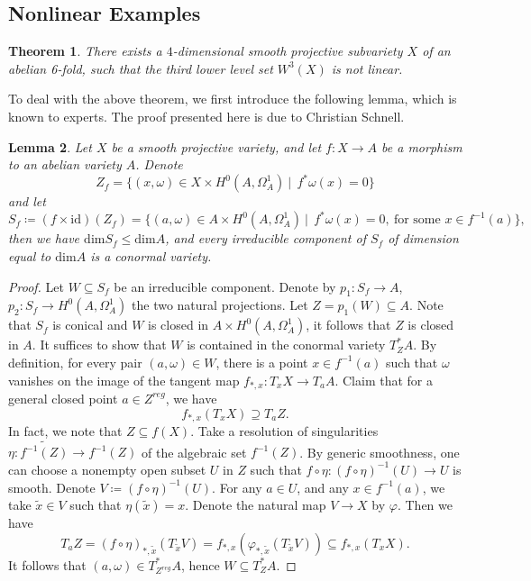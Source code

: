 \documentclass[a4paper,12pt,reqno]{amsart}
\newtheorem{theorem}{Theorem}[section]
\newtheorem{lemma}[theorem]{Lemma}
\theoremstyle{question}
\theoremstyle{definition}
\theoremstyle{remark}
\theoremstyle{cited}
\theoremstyle{citeddef}
\let\tilde\widetilde
\begin{document}
\subsection{Nonlinear Examples}


\begin{theorem}\label{thm:non-linear example}
There exists a $4$-dimensional smooth projective subvariety $X$ of an abelian 6-fold, such that the third lower level set $W^3(X)$ is not linear.
\end{theorem}
 
To deal with the above theorem, we first introduce the following lemma, which is known to experts. The proof presented here is due to Christian Schnell.

\begin{lemma}\label{lem:conormalspace-nonlinear}
  Let $X$ be a smooth projective variety, and let $f\colon X\to A$ be a morphism to an abelian variety $A$. Denote $$Z_{f}=\{(x,\omega)\in X\times H^{0}(A,\Omega^{1}_{A}) ~|~~ f^{*}\omega(x)=0 \}$$ and let $$S_{f}\coloneqq(f\times \mathrm{id})(Z_{f})=\{(a,\omega)\in A\times H^{0}(A,\Omega^{1}_{A}) ~|~~  f^{*}\omega(x)=0,\ \text{for some }x\in f^{-1}(a) \},$$ then we have 
$\mathrm{dim} S_{f}\leq\mathrm{dim} A$, and every irreducible component of $S_{f}$ of dimension equal to $\mathrm{dim}A$ is a conormal variety.   
\end{lemma} 

\begin{proof}
Let $W\subseteq S_{f}$ be an irreducible component. Denote by $p_{1}\colon S_{f}\to A$, $p_{2}\colon S_{f}\to H^{0}(A,\Omega^{1}_{A})$ the two natural projections. Let $Z=p_{1}(W)\subseteq A$. Note that $S_{f}$ is conical and $W$ is closed in $ A\times H^{0}(A,\Omega^{1}_{A})$, it follows that $Z$ is closed in $A$. It suffices to show that $W$ is contained in the conormal variety $ T^{*}_{Z}A$. By definition, for every pair $(a,\omega)\in W$, there is a point $x\in f^{-1}(a)$ such that $\omega$ vanishes on the image of the tangent map $f_{*,x}\colon T_{x}{X}\to T_{a}A$. Claim that for a general closed point $a \in Z^{reg}$, we have $$f_{*,x}(T_{x}{X})\supseteq T_{a}Z.$$
In fact, we note that $Z\subseteq f(X)$. Take a resolution of singularities $\eta\colon \widetilde{f^{-1}(Z)}\to f^{-1}(Z)$ of the algebraic set $f^{-1}(Z)$. By generic smoothness, one can choose a nonempty open subset $U$ in $Z$ such that $f\circ \eta\colon (f\circ \eta)^{-1}(U)\to U$ is smooth. Denote $V\coloneqq (f\circ \eta)^{-1}(U)$. For any $a\in U$, and any $x\in f^{-1}(a)$, we take $\tilde{x}\in V$ such that $\eta(\tilde{x})=x$. Denote the natural map $V\to X$ by $\varphi$. Then we have $$T_aZ=(f\circ\eta)_{*,\tilde{x}}(T_{\tilde{x}}V)=f_{*,x}(\varphi_{*,\tilde{x}}(T_{\tilde{x}}V))\subseteq f_{*,x}(T_{x}{X}).$$
It follows that $(a,\omega)\in T^{*}_{Z^{reg}}A$, hence $W \subseteq T^{*}_{Z}A$.
\end{proof}
\end{document}
